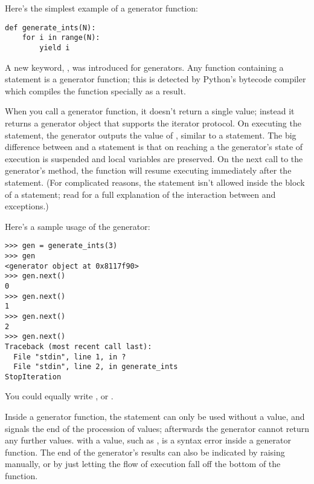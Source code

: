 \documentclass{howto}
\begin{document}
Here's the simplest example of a generator function:

\begin{verbatim}
def generate_ints(N):
    for i in range(N):
        yield i
\end{verbatim}

A new keyword, , was introduced for generators.  Any
function containing a  statement is a generator
function; this is detected by Python's bytecode compiler which
compiles the function specially as a result.  

When you call a generator function, it doesn't return a single value;
instead it returns a generator object that supports the iterator
protocol.  On executing the  statement, the generator
outputs the value of , similar to a 
statement.  The big difference between  and a
 statement is that on reaching a  the
generator's state of execution is suspended and local variables are
preserved.  On the next call to the generator's  method,
the function will resume executing immediately after the
 statement.  (For complicated reasons, the
 statement isn't allowed inside the  block
of a  statement; read  for a full
explanation of the interaction between  and
exceptions.)

Here's a sample usage of the  generator:

\begin{verbatim}
>>> gen = generate_ints(3)
>>> gen
<generator object at 0x8117f90>
>>> gen.next()
0
>>> gen.next()
1
>>> gen.next()
2
>>> gen.next()
Traceback (most recent call last):
  File "stdin", line 1, in ?
  File "stdin", line 2, in generate_ints
StopIteration
\end{verbatim}

You could equally write , or
.

Inside a generator function, the  statement can only
be used without a value, and signals the end of the procession of
values; afterwards the generator cannot return any further values.
 with a value, such as , is a syntax
error inside a generator function.  The end of the generator's results
can also be indicated by raising  manually,
or by just letting the flow of execution fall off the bottom of the
function.
\end{document}
